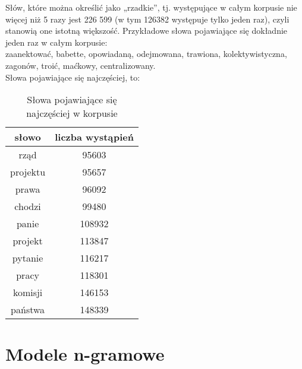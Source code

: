 \documentclass[a4paper,11pt,twoside]{report}
\theoremstyle{definition}
\begin{document}
Słów, które można określić jako „rzadkie”, tj. występujące w całym korpusie nie więcej niż 5 razy jest 226 599 (w tym 126382 występuje tylko jeden raz), czyli stanowią one istotną większość. Przykładowe słowa pojawiające się dokładnie jeden raz w całym korpusie:\\
 zaanektować, babette, opowiadaną, odejmowana, trawiona, kolektywistyczna, zagonów, troić, maćkowy, centralizowany.\\
Słowa pojawiające się najczęściej, to:
\begin{table}[h] \centering
\begin{tabular}{| c | c |}
\hline
słowo & liczba wystąpień \\ \hline
rząd & 95603 \\
projektu & 95657 \\
prawa &  96092 \\
chodzi & 99480 \\
panie & 108932 \\
projekt & 113847 \\
pytanie & 116217 \\
pracy & 118301 \\
komisji & 146153 \\
państwa & 148339\\
\hline
\end{tabular}
\caption{Słowa pojawiające się najczęściej w korpusie}
\end{table}


\chapter{Modele n-gramowe}
\end{document}
